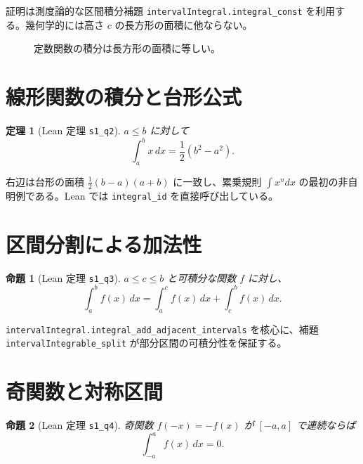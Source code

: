 \documentclass[luatex]{ltjsarticle}
\theoremstyle{definition}
\theoremstyle{plain}
\newtheorem{theorem}{定理}
\newtheorem{proposition}{命題}
\theoremstyle{remark}
\begin{document}
証明は測度論的な区間積分補題 \texttt{intervalIntegral.integral\_const} を利用する。幾何学的には高さ \(c\) の長方形の面積に他ならない。

\begin{figure}[h]
\centering
{}
\caption{定数関数の積分は長方形の面積に等しい。}
\end{figure}

\section{線形関数の積分と台形公式}

\begin{theorem}[Lean 定理 \texttt{s1\_q2}]
\label{thm:s1q2}
\(a\le b\) に対して
\[
\int_a^b x\,dx = \frac{1}{2}(b^2-a^2).
\]
\end{theorem}

右辺は台形の面積 \(\tfrac{1}{2}(b-a)(a+b)\) に一致し、累乗規則 \(\int x^n dx\) の最初の非自明例である。Lean では \verb|integral_id| を直接呼び出している。

\section{区間分割による加法性}
\begin{proposition}[Lean 定理 \texttt{s1\_q3}]
\label{prop:s1q3}
\(a\le c\le b\) と可積分な関数 \(f\) に対し、
\[
\int_a^b f(x)\,dx = \int_a^c f(x)\,dx + \int_c^b f(x)\,dx.
\]
\end{proposition}

\verb|intervalIntegral.integral_add_adjacent_intervals| を核心に、補題 \texttt{intervalIntegrable\_split} が部分区間の可積分性を保証する。

\section{奇関数と対称区間}
\begin{proposition}[Lean 定理 \texttt{s1\_q4}]
\label{prop:s1q4}
奇関数 \(f(-x)=-f(x)\) が \([-a,a]\) で連続ならば
\[
\int_{-a}^{a} f(x)\,dx = 0.
\]
\end{proposition}
\end{document}
